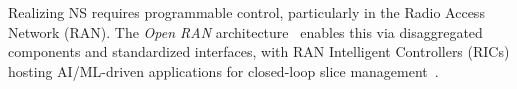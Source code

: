 \documentclass[12pt,lettersize,journal,onecolumn]{IEEEtran}
\begin{document}
Realizing NS requires programmable control, particularly in the Radio Access Network (RAN). The \textit{Open RAN} architecture~\cite{oran23architecture} enables this via disaggregated components and standardized interfaces, with RAN Intelligent Controllers (RICs) hosting AI/ML-driven applications for closed-loop slice management~\cite{comst23polese}.
\end{document}
